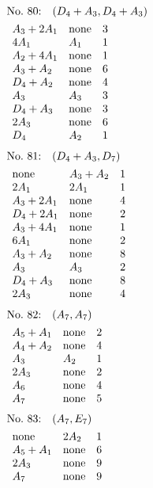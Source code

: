 %
%
\begin{align*}
&\hbox to 4cm {\textrm{No.~80:}\quad$(D_{4}+A_{3}, D_{4}+A_{3})$\hss}\\ 
&\begin{array}{lll}
A_{3}+2A_{1} & \none & 3\\
4A_{1} & A_{1} & 1\\
A_{2}+4A_{1} & \none & 1\\
A_{3}+A_{2} & \none & 6\\
D_{4}+A_{2} & \none & 4\\
A_{3} & A_{3} & 3\\
D_{4}+A_{3} & \none & 3\\
2A_{3} & \none & 6\\
D_{4} & A_{2} & 1\\
\end{array}
\end{align*}
%
%
\begin{align*}
&\hbox to 4cm {\textrm{No.~81:}\quad$(D_{4}+A_{3}, D_{7})$\hss}\\ 
&\begin{array}{lll}
\none & A_{3}+A_{2} & 1\\
2A_{1} & 2A_{1} & 1\\
A_{3}+2A_{1} & \none & 4\\
D_{4}+2A_{1} & \none & 2\\
A_{3}+4A_{1} & \none & 1\\
6A_{1} & \none & 2\\
A_{3}+A_{2} & \none & 8\\
A_{3} & A_{3} & 2\\
D_{4}+A_{3} & \none & 8\\
2A_{3} & \none & 4\\
\end{array}
\end{align*}
%
%
\begin{align*}
&\hbox to 4cm {\textrm{No.~82:}\quad$(A_{7}, A_{7})$\hss}\\ 
&\begin{array}{lll}
A_{5}+A_{1} & \none & 2\\
A_{4}+A_{2} & \none & 4\\
A_{3} & A_{2} & 1\\
2A_{3} & \none & 2\\
A_{6} & \none & 4\\
A_{7} & \none & 5\\
\end{array}
\end{align*}
%
%
\begin{align*}
&\hbox to 4cm {\textrm{No.~83:}\quad$(A_{7}, E_{7})$\hss}\\ 
&\begin{array}{lll}
\none & 2A_{2} & 1\\
A_{5}+A_{1} & \none & 6\\
2A_{3} & \none & 9\\
A_{7} & \none & 9\\
\end{array}
\end{align*}
